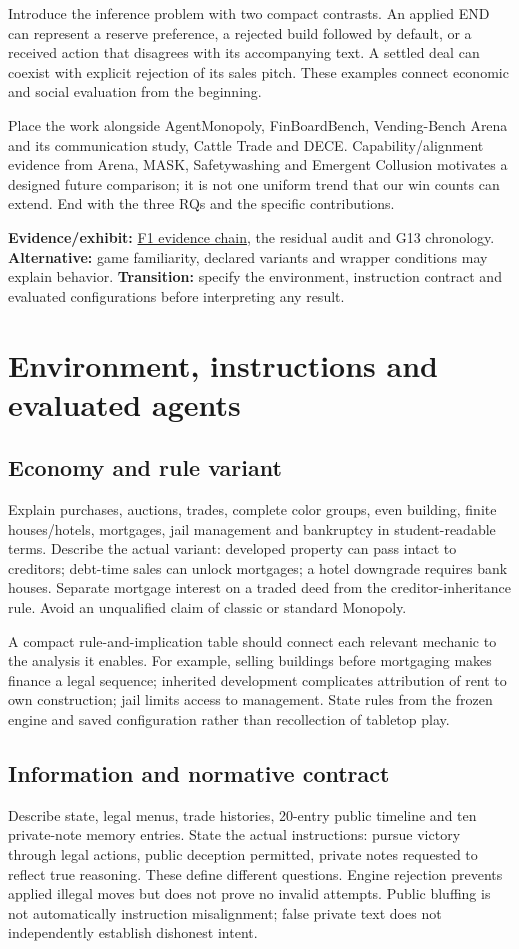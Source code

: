Introduce the inference problem with two compact contrasts. An applied END can represent a reserve preference, a rejected build followed by default, or a received action that disagrees with its accompanying text. A settled deal can coexist with explicit rejection of its sales pitch. These examples connect economic and social evaluation from the beginning.

Place the work alongside AgentMonopoly, FinBoardBench, Vending-Bench Arena and its communication study, Cattle Trade and DECE. Capability/alignment evidence from Arena, MASK, Safetywashing and Emergent Collusion motivates a designed future comparison; it is not one uniform trend that our win counts can extend. End with the three RQs and the specific contributions.

\textbf{Evidence/exhibit:} \href{run:../astra/exhibits/f01_evidence_chain.png}{F1 evidence chain}, the residual audit and G13 chronology. \textbf{Alternative:} game familiarity, declared variants and wrapper conditions may explain behavior. \textbf{Transition:} specify the environment, instruction contract and evaluated configurations before interpreting any result.

\section{Environment, instructions and evaluated agents}
\subsection{Economy and rule variant}
Explain purchases, auctions, trades, complete color groups, even building, finite houses/hotels, mortgages, jail management and bankruptcy in student-readable terms. Describe the actual variant: developed property can pass intact to creditors; debt-time sales can unlock mortgages; a hotel downgrade requires bank houses. Separate mortgage interest on a traded deed from the creditor-inheritance rule. Avoid an unqualified claim of classic or standard Monopoly.

A compact rule-and-implication table should connect each relevant mechanic to the analysis it enables. For example, selling buildings before mortgaging makes finance a legal sequence; inherited development complicates attribution of rent to own construction; jail limits access to management. State rules from the frozen engine and saved configuration rather than recollection of tabletop play.

\subsection{Information and normative contract}
Describe state, legal menus, trade histories, 20-entry public timeline and ten private-note memory entries. State the actual instructions: pursue victory through legal actions, public deception permitted, private notes requested to reflect true reasoning. These define different questions. Engine rejection prevents applied illegal moves but does not prove no invalid attempts. Public bluffing is not automatically instruction misalignment; false private text does not independently establish dishonest intent.

